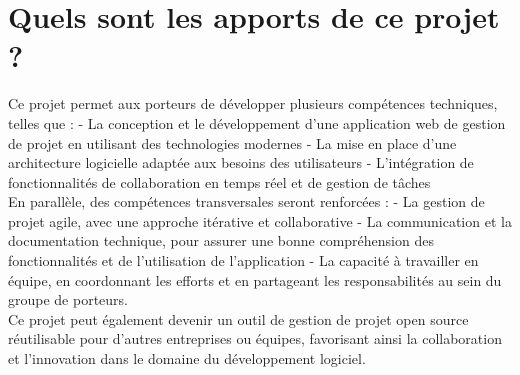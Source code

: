 \section{Quels sont les apports de ce projet ?}

Ce projet permet aux porteurs de développer plusieurs compétences techniques, telles que :
- La conception et le développement d'une application web de gestion de projet en utilisant des technologies modernes
- La mise en place d'une architecture logicielle adaptée aux besoins des utilisateurs
- L'intégration de fonctionnalités de collaboration en temps réel et de gestion de tâches\\

En parallèle, des compétences transversales seront renforcées :
- La gestion de projet agile, avec une approche itérative et collaborative
- La communication et la documentation technique, pour assurer une bonne compréhension des fonctionnalités et de l'utilisation de l'application
- La capacité à travailler en équipe, en coordonnant les efforts et en partageant les responsabilités au sein du groupe de porteurs.\\

Ce projet peut également devenir un outil de gestion de projet open source réutilisable pour d'autres entreprises ou équipes, favorisant ainsi la collaboration et l'innovation dans le domaine du développement logiciel.
